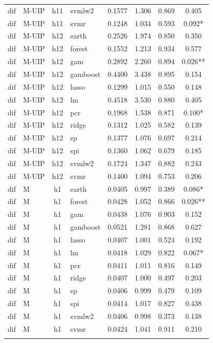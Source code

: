 \begin{ThreePartTable}
\begin{longtable}[t]{llclcccc}
dif & M-UIP & h11 & svmlw2 & 0.1577 & 1.306 & 0.869 & 0.405\\
dif & M-UIP & h11 & svmr & 0.1248 & 1.034 & 0.593 & 0.092*\\
\addlinespace
dif & M-UIP & h12 & earth & 0.2526 & 1.974 & 0.850 & 0.350\\
dif & M-UIP & h12 & forest & 0.1552 & 1.213 & 0.934 & 0.577\\
dif & M-UIP & h12 & gam & 0.2892 & 2.260 & 0.894 & 0.026**\\
dif & M-UIP & h12 & gamboost & 0.4400 & 3.438 & 0.895 & 0.154\\
dif & M-UIP & h12 & lasso & 0.1299 & 1.015 & 0.550 & 0.148\\
dif & M-UIP & h12 & lm & 0.4518 & 3.530 & 0.880 & 0.405\\
dif & M-UIP & h12 & pcr & 0.1968 & 1.538 & 0.871 & 0.100*\\
dif & M-UIP & h12 & ridge & 0.1312 & 1.025 & 0.582 & 0.139\\
dif & M-UIP & h12 & sp & 0.1377 & 1.076 & 0.697 & 0.214\\
dif & M-UIP & h12 & spi & 0.1360 & 1.062 & 0.679 & 0.185\\
dif & M-UIP & h12 & svmlw2 & 0.1724 & 1.347 & 0.882 & 0.243\\
dif & M-UIP & h12 & svmr & 0.1400 & 1.094 & 0.753 & 0.206\\
\addlinespace
dif & M & h1 & earth & 0.0405 & 0.997 & 0.389 & 0.086*\\
dif & M & h1 & forest & 0.0428 & 1.052 & 0.866 & 0.026**\\
dif & M & h1 & gam & 0.0438 & 1.076 & 0.903 & 0.152\\
dif & M & h1 & gamboost & 0.0521 & 1.281 & 0.868 & 0.627\\
dif & M & h1 & lasso & 0.0407 & 1.001 & 0.524 & 0.192\\
dif & M & h1 & lm & 0.0418 & 1.029 & 0.822 & 0.067*\\
dif & M & h1 & pcr & 0.0411 & 1.011 & 0.816 & 0.149\\
dif & M & h1 & ridge & 0.0407 & 1.000 & 0.497 & 0.203\\
dif & M & h1 & sp & 0.0406 & 0.999 & 0.479 & 0.109\\
dif & M & h1 & spi & 0.0414 & 1.017 & 0.827 & 0.438\\
dif & M & h1 & svmlw2 & 0.0406 & 0.998 & 0.373 & 0.138\\
dif & M & h1 & svmr & 0.0424 & 1.041 & 0.911 & 0.210\\
\addlinespace

\end{longtable}
\end{ThreePartTable}
